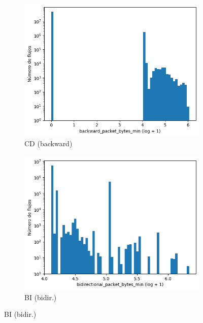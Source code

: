 \begin{figure}[H]
\begin{subfigure}[b]{0.26\textwidth}
        \includegraphics[width=\textwidth]{media/packet_pincer_cicddos/backward_packet_bytes_min_log_x_log_y.png}
        \caption{CD (backward)}
    \end{subfigure}
    \hfill
    \begin{subfigure}[b]{0.26\textwidth}
        \centering
        \includegraphics[width=\linewidth]{media/packet_pincer_botiot/bidirectional_packet_bytes_min_log_x_log_y.png}
        \caption{BI (bidir.)}

\end{subfigure}
\end{figure}

